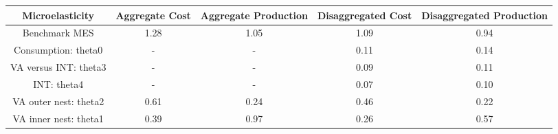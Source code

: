 \begin{table}[!ht]
\setlength\tabcolsep{0.425em}
\setlength\aboverulesep{0pt}
\setlength\belowrulesep{0.2em}
\centering
\begin{threeparttable}
\begin{tabular}{ccccc}
\toprule[0.1em]
Microelasticity & Aggregate Cost & Aggregate Production & Disaggregated Cost & Disaggregated Production \\[0.2em]
\midrule[0.075em]
Benchmark MES & 1.28 & 1.05 & 1.09 & 0.94 \\[0.2em]
Consumption: theta0 & - & - & 0.11 & 0.14 \\[0.2em]
VA versus INT: theta3 & - & - & 0.09 & 0.11 \\[0.2em]
INT: theta4 & - & - & 0.07 & 0.10 \\[0.2em]
VA outer nest: theta2 & 0.61 & 0.24 & 0.46 & 0.22 \\[0.2em]
VA inner nest: theta1 & 0.39 & 0.97 & 0.26 & 0.57 \\[0.2em]
\bottomrule[0.1em]
\end{tabular}
\end{threeparttable}
\end{table}

